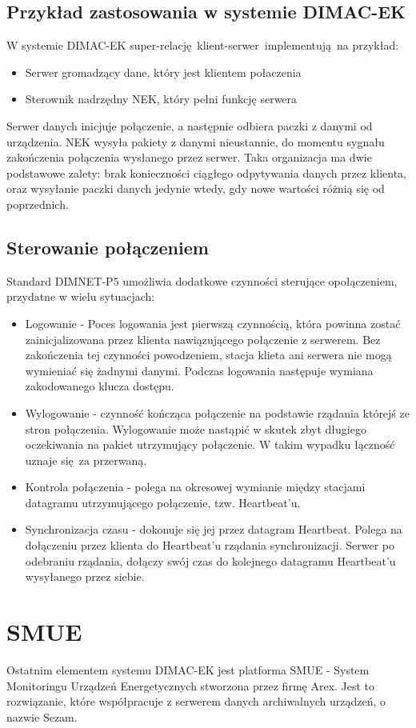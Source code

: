 \subsection{Przykład zastosowania w systemie DIMAC-EK}
W systemie DIMAC-EK super-relację klient-serwer implementują na przykład:
\begin{itemize}
\item Serwer gromadzący dane, który jest klientem połaczenia
\item Sterownik nadrzędny NEK, który pełni funkcję serwera
\end{itemize} 
Serwer danych inicjuje połączenie, a następnie odbiera paczki z danymi od urządzenia. NEK wysyła pakiety z danymi nieustannie, do momentu sygnału zakończenia połączenia wysłanego przez serwer. Taka organizacja ma dwie podstawowe zalety: brak konieczności ciągłego odpytywania danych przez klienta, oraz wysyłanie paczki danych jedynie wtedy, gdy nowe wartości różnią się od poprzednich.

\subsection{Sterowanie połączeniem}
Standard DIMNET-P5 umożliwia dodatkowe czynności sterujące opołączeniem, przydatne w wielu sytuacjach:
\begin{itemize}
\item Logowanie - Poces logowania jest pierwszą czynnością, która powinna zostać zainicjalizowana przez klienta nawiązującego połączenie z serwerem. Bez zakończenia tej czynności powodzeniem, stacja klieta ani serwera nie mogą wymieniać się żadnymi danymi. Podczas logowania następuje wymiana zakodowanego klucza dostępu.
\item Wylogowanie - czynność kończąca połączenie na podstawie rządania którejś ze stron połączenia. Wylogowanie może nastąpić w skutek zbyt długiego oczekiwania na pakiet utrzymujący połączenie. W takim wypadku łączność uznaje się za przerwaną.
\item Kontrola połączenia - polega na okresowej wymianie między stacjami datagramu utrzymującego połączenie, tzw. Heartbeat'u.
\item Synchronizacja czasu - dokonuje się jej przez datagram Heartbeat. Polega na dołączeniu przez klienta do Heartbeat'u rządania synchronizacji. Serwer po odebraniu rządania, dołączy swój czas do kolejnego datagramu Heartbeat'u wysyłanego przez siebie.
\end{itemize}


\section{SMUE}
Ostatnim elementem systemu DIMAC-EK jest platforma SMUE - System Monitoringu Urządzeń Energetycznych stworzona przez firmę Arex. Jest to rozwiązanie, które współpracuje z serwerem danych archiwalnych urządzeń, o nazwie Sezam. 

